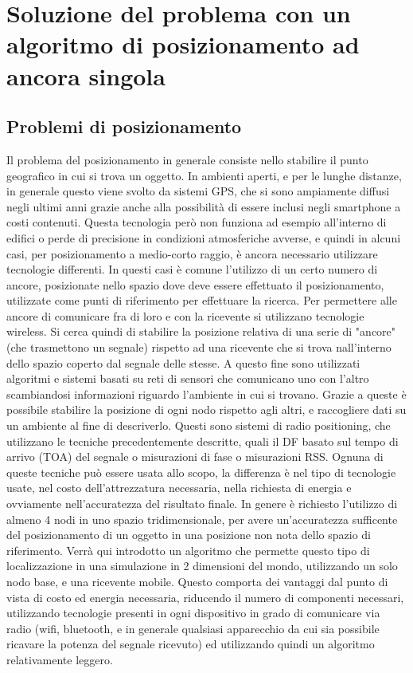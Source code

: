 \chapter{Soluzione del problema con un algoritmo di posizionamento ad ancora singola}
\section{Problemi di posizionamento}
Il problema del posizionamento in generale consiste nello stabilire il punto geografico in cui si trova un oggetto. In ambienti aperti, e per le lunghe distanze, in generale questo viene svolto da sistemi GPS, che si sono ampiamente diffusi negli ultimi anni grazie anche alla possibilità di essere inclusi negli smartphone a costi contenuti. Questa tecnologia però non funziona  ad esempio all'interno di edifici o perde di precisione in condizioni atmosferiche avverse, e quindi in alcuni casi, per posizionamento a medio-corto raggio, è ancora necessario utilizzare tecnologie differenti. In questi casi è comune l'utilizzo di un certo numero di ancore, posizionate nello spazio dove deve essere effettuato il posizionamento, utilizzate come punti di riferimento per effettuare la ricerca. Per permettere alle ancore di comunicare fra di loro e con la ricevente si utilizzano tecnologie wireless. Si cerca quindi di stabilire la posizione relativa di una serie di "ancore" (che trasmettono un segnale) rispetto ad una ricevente che si trova nall'interno dello spazio coperto dal segnale delle stesse.
A questo fine sono utilizzati algoritmi e sistemi basati su reti di sensori che comunicano uno con l'altro scambiandosi informazioni riguardo l'ambiente in cui si trovano. Grazie a queste è possibile stabilire la posizione di ogni nodo rispetto agli altri, e raccogliere dati su un ambiente al fine di descriverlo. 
Questi sono sistemi di radio positioning, che utilizzano le tecniche precedentemente descritte, quali il DF basato sul tempo di arrivo (TOA) del segnale o misurazioni di fase o misurazioni RSS. Ognuna di queste tecniche può essere usata allo scopo, la differenza è nel tipo di tecnologie usate, nel costo dell'attrezzatura necessaria, nella richiesta di energia e ovviamente nell'accuratezza del risultato finale.
In genere è richiesto l'utilizzo di almeno 4 nodi in uno spazio tridimensionale, per avere un'accuratezza sufficente del posizionamento di un oggetto in una posizione non nota dello spazio di riferimento. Verrà qui introdotto un algoritmo che permette questo tipo di localizzazione in una simulazione in 2 dimensioni del mondo, utilizzando un solo nodo base, e una ricevente mobile. Questo comporta dei vantaggi dal punto di vista di costo ed energia necessaria, riducendo il numero di componenti necessari, utilizzando tecnologie presenti in ogni dispositivo in grado di comunicare via radio (wifi, bluetooth, e in generale qualsiasi apparecchio da cui sia possibile ricavare la potenza del segnale ricevuto) ed utilizzando quindi un algoritmo relativamente leggero.
	
